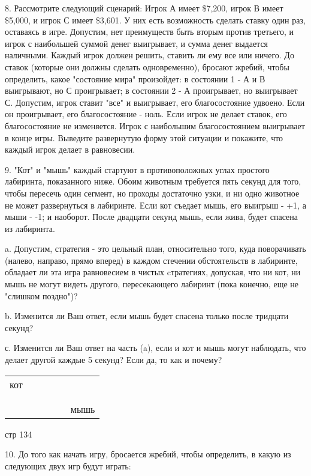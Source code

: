 \documentclass[a4paper,12pt]{article}
\begin{document}
8. Рассмотрите следующий сценарий: Игрок А имеет
\$7,200, игрок В имеет \$5,000, и игрок С имеет
\$3,601. У них есть возможность сделать ставку один
раз, оставаясь в игре. Допустим, нет преимуществ
быть вторым против третьего, и игрок с наибольшей
суммой денег выигрывает, и сумма денег выдается
наличными. Каждый игрок должен решить, ставить ли
ему все или ничего. До ставок (которые они должны
сделать одновременно), бросают жребий, чтобы
определить, какое "состояние мира" произойдет: в
состоянии 1 - А и В выигрывают, но С проигрывает; в
состоянии 2 - А проигрывает, но выигрывает С.
Допустим, игрок ставит "все" и выигрывает, его
благосостояние удвоено. Если он проигрывает, его
благосостояние - ноль. Если игрок не делает ставок,
его благосостояние не изменяется. Игрок с
наибольшим благосостоянием выигрывает в конце игры.
Выведите развернутую форму этой ситуации и
покажите, что каждый игрок делает в равновесии.

9. "Кот" и "мышь" каждый стартуют в противоположных
углах простого лабиринта, показанного ниже. Обоим
животным требуется пять секунд для того, чтобы
пересечь один сегмент, но проходы достаточно узки,
и ни одно животное не может развернуться в
лабиринте. Если кот съедает мышь, его выигрыш - +1,
а мыши - -1; и наоборот. После двадцати секунд
мышь, если жива, будет спасена из лабиринта.

a. Допустим, стратегия - это цельный план,
относительно того, куда поворачивать (налево,
направо, прямо вперед) в каждом стечении
обстоятельств в лабиринте, обладает ли эта игра
равновесием в чистых cтратегиях, допуская, что ни
кот, ни мышь не могут видеть другого, пересекающего
лабиринт (пока конечно, еще не "слишком поздно")?

b. Изменится ли Ваш ответ, если мышь будет спасена
только после тридцати секунд?

с. Изменится ли Ваш ответ на часть (a), если и кот
и мышь могут наблюдать, что делает другой каждые 5
секунд? Если да, то как и почему?

\begin{tabular}{l|l|llll}
\cline{1-1}\cline{3-5} кот &  &  &  &  &  \\
\cline{1-1}\cline{3-5} &  &  &  &  &  \\ &  &  &  &
&  \\ \cline{3-6} &  &  &  &  & мышь \\ \cline{3-6}
\end{tabular}

стр 134

10. До того как начать игру, бросается жребий,
чтобы определить, в какую из следующих двух игр
будут играть:
\end{document}
